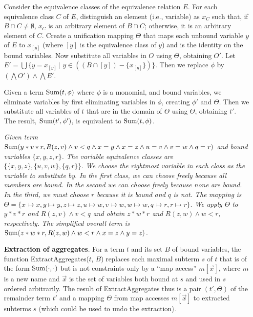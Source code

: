 Consider the equivalence classes of the equivalence relation $E$.
For each equivalence class $C$ of $E$, distinguish an element
(i.e., variable) as $x_C$ such that,
if $B \cap C \neq \emptyset$, $x_C$ is an arbitrary element of $B \cap C$;
otherwise, it is an arbitrary element of $C$.
Create a unification mapping
$\Theta$ that maps each unbound variable $y$ of $E$ to $x_{[y]}$ (where $[y]$ is the
equivalence class of $y$) and is the identity on the bound variables.
Now substitute all variables in $O$
using $\Theta$, obtaining $O'$. Let
$E' =  \bigcup \{ y = x_{[y]} \mid y \in ((B \cap [y]) - \{ x_{[y]} \}) \}$.
Then we replace $\phi$ by $(\bigwedge O') \land \bigwedge E'$.

Given a term $\mbox{Sum}(t,\phi)$ where $\phi$ is a monomial,
and bound variables, we eliminate variables by 
first eliminating variables in $\phi$, creating $\phi'$ and $\Theta$.
Then we substitute all variables of $t$ that are in the domain of $\Theta$
using $\Theta$, obtaining $t'$. The result, $\mbox{Sum}(t', \phi')$, is equivalent
to $\mbox{Sum}(t,\phi)$.


\begin{example} \em
Given term $\mbox{Sum}(y*v*r, R(z, v) \land v<q
\land x=y \land x=z \land u=v \land v=w \land q=r)$
and bound variables $\{x,y,z,r\}$.
The variable equivalence classes are
$\{ \{x,y,z\}, \{u,v,w\}, \{q,r\} \}$. We choose the rightmost variable in
each class as the variable to substitute by. In the first class, we can choose
freely because all members are bound. In the second we can choose freely
because none are bound. In the third, we must choose $r$ because it is bound
and $q$ is not.
The mapping is
$\Theta = \{ x \mapsto x, y \mapsto y, z \mapsto z, u \mapsto w, v \mapsto w,
w \mapsto w, q \mapsto r, r \mapsto r \}$.
We apply $\Theta$ to $y*v*r$ and $R(z, v) \land v < q$ and obtain
$z*w*r$ and $R(z,w) \land w<r$, respectively. The simplified
overall term is
$\mbox{Sum}(z*w*r, R(z,w) \land w<r \land x=z \land y=z)$.
\punto
\end{example}


{\bf Extraction of aggregates}.
For a term $t$ and its set $B$ of bound variables,
the function ExtractAggregates($t$, $B$)
replaces each maximal subterm $s$ of $t$
that is of the form $\mbox{Sum}(\cdot, \cdot)$ but is not constraints-only
by a ``map access''  $m[\vec{x}]$, where
$m$ is a new name and $\vec{x}$ is the set of variables
both bound at $s$ and used in $s$ ordered arbitrarily.
The result of ExtractAggregates thus is a pair $(t', \Theta)$ of the remainder
term $t'$ and a mapping $\Theta$ from map accesses $m[\vec{x}]$ to extracted
subterms $s$ (which could be used to undo the extraction).

